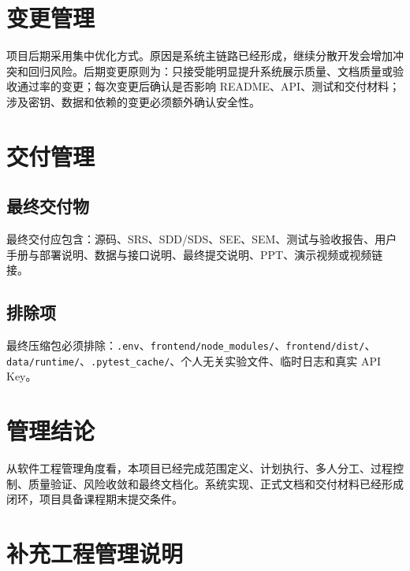 \documentclass[12pt,a4paper]{ctexart}
\newcommand{\code}[1]{{\footnotesize\nolinkurl{#1}}}
\begin{document}
\section{变更管理}
项目后期采用集中优化方式。原因是系统主链路已经形成，继续分散开发会增加冲突和回归风险。后期变更原则为：只接受能明显提升系统展示质量、文档质量或验收通过率的变更；每次变更后确认是否影响 README、API、测试和交付材料；涉及密钥、数据和依赖的变更必须额外确认安全性。

\section{交付管理}
\subsection{最终交付物}
最终交付应包含：源码、SRS、SDD/SDS、SEE、SEM、测试与验收报告、用户手册与部署说明、数据与接口说明、最终提交说明、PPT、演示视频或视频链接。

\subsection{排除项}
最终压缩包必须排除：\code{.env}、\code{frontend/node_modules/}、\code{frontend/dist/}、\code{data/runtime/}、\code{.pytest_cache/}、个人无关实验文件、临时日志和真实 API Key。

\section{管理结论}
从软件工程管理角度看，本项目已经完成范围定义、计划执行、多人分工、过程控制、质量验证、风险收敛和最终文档化。系统实现、正式文档和交付材料已经形成闭环，项目具备课程期末提交条件。

\clearpage
\section{补充工程管理说明}
\end{document}
